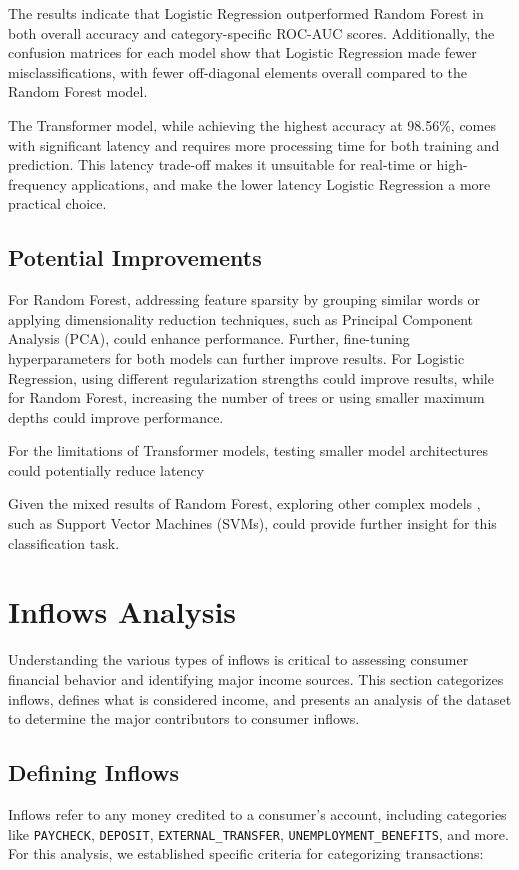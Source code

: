 \documentclass[12pt,letterpaper]{article}
\begin{document}
The results indicate that Logistic Regression outperformed Random Forest in both overall accuracy and category-specific ROC-AUC scores. Additionally, the confusion matrices for each model show that Logistic Regression made fewer misclassifications, with fewer off-diagonal elements overall compared to the Random Forest model.

The Transformer model, while achieving the highest accuracy at 98.56\%, comes with significant latency and requires more processing time for both training and prediction. This latency trade-off makes it unsuitable for real-time or high-frequency applications, and make the lower latency Logistic Regression a more practical choice.


\subsection{Potential Improvements}
For Random Forest, addressing feature sparsity by grouping similar words or applying dimensionality reduction techniques, such as Principal Component Analysis (PCA), could enhance performance. Further, fine-tuning hyperparameters for both models can further improve results. For Logistic Regression, using different regularization strengths could improve results, while for Random Forest, increasing the number of trees or using smaller maximum depths could improve performance.

For the limitations of Transformer models, testing smaller model architectures could potentially reduce latency

Given the mixed results of Random Forest, exploring other complex models , such as Support Vector Machines (SVMs), could provide further insight for this classification task.

\section{Inflows Analysis}
Understanding the various types of inflows is critical to assessing consumer financial behavior and identifying major income sources. This section categorizes inflows, defines what is considered income, and presents an analysis of the dataset to determine the major contributors to consumer inflows.

\subsection{Defining Inflows}
Inflows refer to any money credited to a consumer's account, including categories like \texttt{PAYCHECK}, \texttt{DEPOSIT}, \texttt{EXTERNAL\_TRANSFER}, \texttt{UNEMPLOYMENT\_BENEFITS}, and more. For this analysis, we established specific criteria for categorizing transactions:
\end{document}
